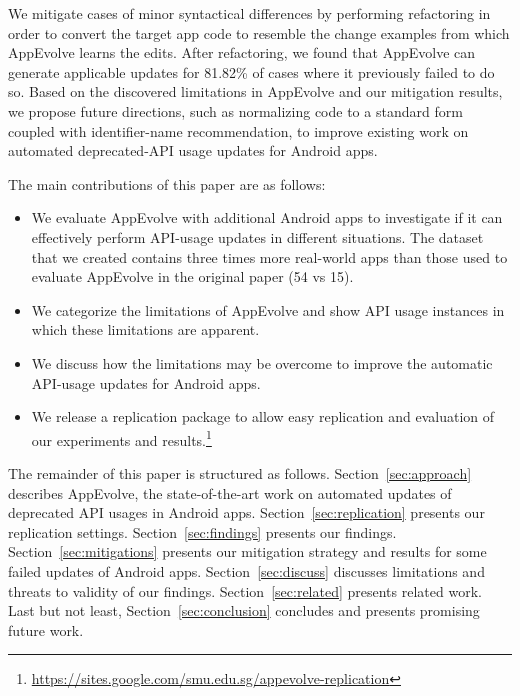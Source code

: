 We mitigate cases of minor syntactical differences by performing refactoring in order to convert the target app code to resemble the change examples from which AppEvolve learns the edits.
After refactoring, we found that AppEvolve can generate applicable updates for 81.82\% of cases where it previously failed to do so.
Based on the discovered limitations in AppEvolve and our mitigation results, we propose future directions, such as normalizing code to a standard form coupled with identifier-name recommendation, to improve existing work on automated deprecated-API usage updates for Android apps.

The main contributions of this paper are as follows:
\begin{itemize}
	\item We  evaluate AppEvolve with additional Android apps to investigate if it can effectively perform API-usage updates in different situations. The dataset that we created contains three times more real-world apps than those used to evaluate AppEvolve in the original paper (54 vs 15).
	\item We categorize the limitations of AppEvolve and show API usage instances in which these limitations are apparent.
	\item We discuss how the limitations may be overcome to improve the automatic API-usage updates for Android apps.
	\item We release a replication package to allow easy replication and evaluation of our experiments and results.\footnote{\url{https://sites.google.com/smu.edu.sg/appevolve-replication}}
	 
\end{itemize}

The remainder of this paper is structured as follows. Section~\ref{sec:approach} describes AppEvolve, the state-of-the-art work on automated updates of deprecated API usages in Android apps. Section~\ref{sec:replication} presents our replication settings. Section~\ref{sec:findings} presents our findings. Section~\ref{sec:mitigations} presents our mitigation strategy and results for some failed updates of Android apps.
Section~\ref{sec:discuss} discusses limitations and threats to validity of our findings.
Section~\ref{sec:related} presents related work.
Last but not least, Section~\ref{sec:conclusion} concludes and presents promising future work.
